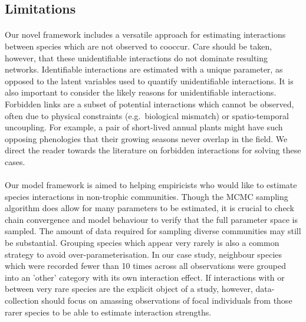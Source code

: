 \documentclass[a4,12pt]{article}
\begin{document}
   \subsection{Limitations}


    \paragraph{}
    Our novel framework includes a versatile approach for estimating interactions between species which are not observed to cooccur. Care should be taken, however, that these unidentifiable interactions do not dominate resulting networks. Identifiable interactions are estimated with a unique parameter, as opposed to the latent variables used to quantify unidentifiable interactions. It is also important to consider the likely reasons for unidentifiable interactions. Forbidden links are a subset of potential interactions which cannot be observed, often due to physical constraints (e.g.\ biological mismatch) or spatio-temporal uncoupling. For example, a pair of short-lived annual plants might have such opposing phenologies that their growing seasons never overlap in the field. We direct the reader towards the literature on forbidden interactions \parencite{Olesen2011, Jordano2016} for solving these cases. 


    \paragraph{}
    Our model framework is aimed to helping empiricists who would like to estimate species interactions in non-trophic communities. Though the MCMC sampling algorithm does allow for many parameters to be estimated, it is crucial to check chain convergence and model behaviour to verify that the full parameter space is sampled. The amount of data required for sampling diverse communities may still be substantial. Grouping species which appear very rarely is also a common strategy to avoid over-parameterisation. In our case study, neighbour species which were recorded fewer than 10 times across all observations were grouped into an 'other' category with its own interaction effect. If interactions with or between very rare species are the explicit object of a study, however, data-collection should focus on amassing observations of focal individuals from those rarer species to be able to estimate  interaction strengths.   
\end{document}
